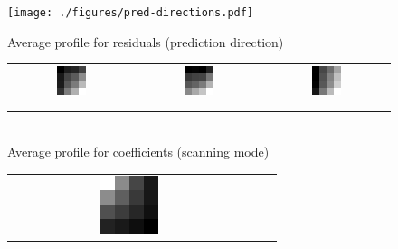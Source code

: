 \documentclass[11pt,a4paper,openright,twoside]{book}
\numberwithin{equation}{section} %
\numberwithin{figure}{section} %
\numberwithin{table}{section} %
\begin{document}
\begin{figure}[tb]
	\centering
	\begin{minipage}{0.48\textwidth}
		\texttt{[image: ./figures/pred-directions.pdf]}
	\end{minipage}
	\begin{minipage}{0.48\textwidth}
		\centering
		\small
		Average profile for residuals (prediction direction)
		\begin{tabular}[H]{ccc}
			\includegraphics[width=0.25\textwidth]{figures/resids-scan-diag.png}
			&
			\includegraphics[width=0.25\textwidth]{figures/resids-scan-horz.png}
			&
			\includegraphics[width=0.25\textwidth]{figures/resids-scan-vert.png}
			\\
			\color{red}{diagonal} & \color{greenish}{vertical} & \color{blue}{horizontal} \\
			& & \\
		\end{tabular}
		\\
		\small
		Average profile for coefficients (scanning mode)
		\begin{tabular}[H]{ccc}
			\includegraphics[width=0.25\textwidth]{figures/coeffs-scan-diag.png}

\end{tabular}
\end{minipage}
\end{figure}
\end{document}

